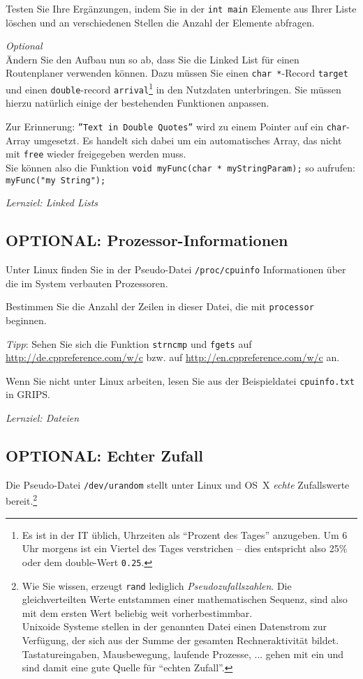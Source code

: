 \documentclass[
	ngerman,
	fontsize=10pt,
	parskip=half,
	titlepage=true,
	DIV=12
]{scrartcl}
\begin{document}
Testen Sie Ihre Ergänzungen, indem Sie in der \texttt{int main} Elemente aus Ihrer Liste löschen und an verschiedenen Stellen die Anzahl der Elemente abfragen.

\emph{Optional}\\
Ändern Sie den Aufbau nun so ab, dass Sie die Linked List für einen Routenplaner verwenden können. Dazu müssen Sie einen \texttt{char *}-Record \texttt{target} und einen \texttt{double}-record \texttt{arrival}\footnote{Es ist in der IT üblich, Uhrzeiten als \enquote{Prozent des Tages} anzugeben. Um 6 Uhr morgens ist ein Viertel des Tages verstrichen -- dies entspricht also 25\% oder dem double-Wert \texttt{0.25}.} in den Nutzdaten unterbringen. Sie müssen hierzu natürlich einige der bestehenden Funktionen anpassen.

Zur Erinnerung: \texttt{''Text in Double Quotes''} wird zu einem Pointer auf ein \texttt{char}-Array umgesetzt. Es handelt sich dabei um ein automatisches Array, das nicht mit \texttt{free} wieder freigegeben werden muss.\\
Sie können also die Funktion \texttt{void myFunc(char * myStringParam);} so aufrufen: \texttt{myFunc("my String");}

\emph{Lernziel: Linked Lists}


\subsection*{OPTIONAL: Prozessor-Informationen}
Unter Linux finden Sie in der Pseudo-Datei \texttt{/proc/cpuinfo} Informationen über die im System
verbauten Prozessoren.

Bestimmen Sie die Anzahl der Zeilen in dieser Datei, die mit \texttt{processor} beginnen.

\emph{Tipp}: Sehen Sie sich die Funktion \texttt{strncmp} und \texttt{fgets} auf \url{http://de.cppreference.com/w/c} bzw. auf \url{http://en.cppreference.com/w/c} an.

Wenn Sie nicht unter Linux arbeiten, lesen Sie aus der Beispieldatei \texttt{cpuinfo.txt} in GRIPS.

\emph{Lernziel: Dateien}


\subsection*{OPTIONAL: Echter Zufall}
Die Pseudo-Datei \texttt{/dev/urandom} stellt unter Linux und OS~X \emph{echte} Zufallswerte bereit.\footnote{Wie Sie wissen, erzeugt \texttt{rand} lediglich \emph{Pseudozufallszahlen}. Die gleichverteilten Werte entstammen einer mathematischen Sequenz, sind also mit dem ersten Wert beliebig weit vorherbestimmbar.\\
Unixoide Systeme stellen in der genannten Datei einen Datenstrom zur Verfügung, der sich aus der Summe der gesamten Rechneraktivität bildet. Tastatureingaben, Mausbewegung, laufende Prozesse, ... gehen mit ein und sind damit eine gute Quelle für \enquote{echten Zufall}.}
\end{document}
